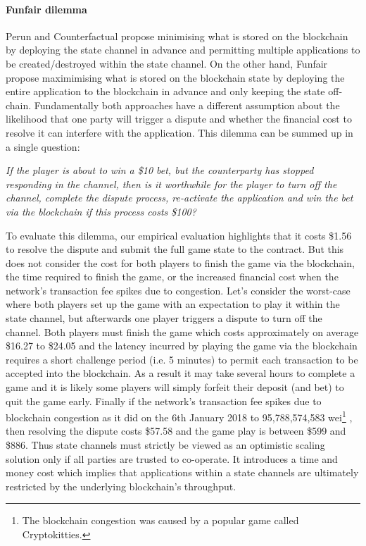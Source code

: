 \documentclass{llncs}
\begin{document}
	\paragraph{Funfair dilemma} 
	Perun and Counterfactual propose minimising what is stored on the blockchain by deploying the state channel in advance and permitting multiple applications to be created/destroyed within the state channel. 
	On the other hand, Funfair propose maximimising what is stored on the blockchain state by deploying the entire application to the blockchain in advance and only keeping the state off-chain. 
	Fundamentally both approaches have a different assumption about the likelihood that one party will trigger a dispute and whether the financial cost to resolve it can interfere with the application. 
	This dilemma can be summed up in a single question:
	
	\begin{center}
		\textit{If the player is about to win a \$10 bet, but the counterparty has stopped responding in the channel, then is it worthwhile for the player to turn off the channel, complete the dispute process, re-activate the application and win the bet via the blockchain if this process costs \$100?} 
	\end{center} 
	
	To evaluate this dilemma, our empirical evaluation highlights that it costs \$1.56 to resolve the dispute and submit the full game state to the contract.
	But this does not consider the cost for both players to finish the game via the blockchain, the time required to finish the game, or the increased financial cost when the network's transaction fee spikes due to congestion. %
	Let's consider the worst-case where both players set up the game with an expectation to play it within the state channel, but afterwards one player triggers a dispute to turn off the channel. 
	Both players must finish the game which costs approximately on average \$16.27 to \$24.05 and the latency incurred by playing the game via the blockchain requires a short challenge period (i.e. 5 minutes) to permit each transaction to be accepted into the blockchain. 
	As a result it may take several hours to complete a game and it is likely some players will simply forfeit their deposit (and bet) to quit the game early. 
	Finally if the network's transaction fee spikes due to blockchain congestion as it did on the 6th January 2018 to 95,788,574,583 wei\footnote{The blockchain congestion was caused by a popular game called Cryptokitties.}  \cite{etherscan}, then resolving the dispute costs \$57.58 and the game play is between \$599 and \$886.  %
	Thus state channels must strictly be viewed as an optimistic scaling solution only if all parties are trusted to co-operate. 
	It introduces a time and money cost which implies that applications within a state channels are ultimately restricted by the underlying blockchain's throughput. 
	
\end{document}
